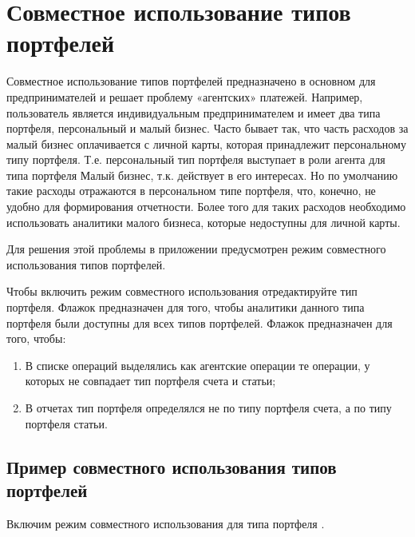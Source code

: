 \documentclass[a4paper,10pt,russian]{sphinxmanual}
\begin{document}
\chapter{Совместное использование типов портфелей}
\label{\detokenize{shared-transactions:chapter-shared-transactions}}\label{\detokenize{shared-transactions:id1}}\label{\detokenize{shared-transactions::doc}}
\sphinxAtStartPar
Совместное использование типов портфелей предназначено в основном для предпринимателей
и решает проблему «агентских» платежей. Например, пользователь является
индивидуальным предпринимателем и имеет два типа портфеля, персональный и малый бизнес.
Часто бывает так, что часть расходов за малый бизнес оплачивается с личной
карты, которая принадлежит персональному типу портфеля. Т.е. персональный тип портфеля
выступает в роли агента для типа портфеля Малый бизнес, т.к. действует в его интересах.
Но по умолчанию такие расходы отражаются в персональном типе портфеля, что, конечно,
не удобно для формирования отчетности. Более того для таких расходов необходимо
использовать аналитики малого бизнеса, которые недоступны для личной карты.

\sphinxAtStartPar
Для решения этой проблемы в приложении предусмотрен режим совместного использования типов
портфелей.

\sphinxAtStartPar
Чтобы включить режим совместного использования отредактируйте тип портфеля.
Флажок  предназначен для того, чтобы аналитики данного типа портфеля
были доступны для всех типов портфелей.
Флажок  предназначен для того, чтобы:
\begin{enumerate}
%
\item {} 
\sphinxAtStartPar
В списке операций выделялись как агентские операции те операции, у которых не совпадает тип портфеля счета и статьи;

\item {} 
\sphinxAtStartPar
В отчетах тип портфеля определялся не по типу портфеля счета, а по типу портфеля статьи.

\end{enumerate}


\section{Пример совместного использования типов портфелей}
\label{\detokenize{shared-transactions:id2}}
\sphinxAtStartPar
Включим режим совместного использования для типа портфеля .
\end{document}
